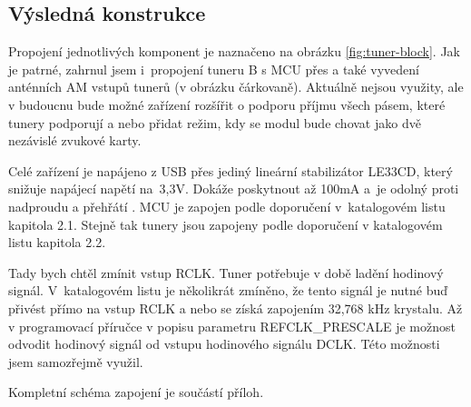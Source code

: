 \subsection{Výsledná konstrukce}
\label{subsec:konstrukce}

Propojení jednotlivých komponent je naznačeno na obrázku \ref{fig:tuner-block}. Jak je patrné, zahrnul jsem i~propojení tuneru B s MCU přes \iis a také vyvedení anténních AM vstupů tunerů (v obrázku čárkovaně). Aktuálně nejsou využity, ale v budoucnu bude možné zařízení rozšířit o podporu příjmu všech pásem, které tunery podporují a nebo přidat režim, kdy se modul bude chovat jako dvě nezávislé zvukové karty.

Celé zařízení je napájeno z USB přes jediný lineární stabilizátor LE33CD, který snižuje napájecí napětí na~3,3V. Dokáže poskytnout až 100mA a~je odolný proti nadproudu a přehřátí \cite{le}. MCU je zapojen podle doporučení v~katalogovém listu \cite{pic} kapitola 2.1. Stejně tak tunery jsou zapojeny podle doporučení v katalogovém listu \cite{tuner-datasheet} kapitola 2.2.

 Tady bych chtěl zmínit vstup RCLK. Tuner potřebuje v době ladění hodinový signál. V~katalogovém listu je několikrát zmíněno, že tento signál je nutné buď přivést přímo na vstup RCLK a nebo se získá zapojením 32,768 kHz krystalu. Až v programovací příručce \cite{tuner-programing} v popisu parametru REFCLK\_PRESCALE je možnost odvodit hodinový signál od vstupu hodinového signálu \iis DCLK. Této možnosti jsem samozřejmě využil.
 
Kompletní schéma zapojení je součástí příloh.
